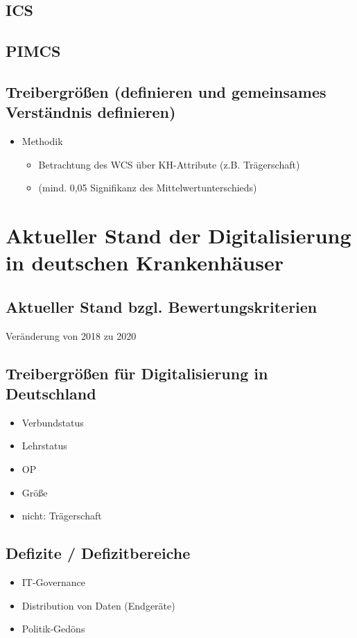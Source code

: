 	\subsection{ICS}
	\subsection{PIMCS}
	\subsection{Treibergrößen (definieren und gemeinsames Verständnis definieren)}
	\begin{itemize}
		\item Methodik
		\begin{itemize}
			\item Betrachtung des WCS über KH-Attribute (z.B. Trägerschaft)
			\item (mind. 0,05 Signifikanz des Mittelwertunterschieds)
		\end{itemize}
	\end{itemize}
\section{Aktueller Stand der Digitalisierung in deutschen Krankenhäuser}
	\subsection{Aktueller Stand bzgl. Bewertungskriterien}
		Veränderung von 2018 zu 2020
	\subsection{Treibergrößen für Digitalisierung in Deutschland}
	\begin{itemize}
		\item Verbundstatus \parencite{cresswell2013}
		\item Lehrstatus
		\item OP
		\item Größe \parencite{cresswell2013}
		\item nicht: Trägerschaft \parencite{cresswell2013}
	\end{itemize}
	\subsection{Defizite / Defizitbereiche}
	\begin{itemize}
		\item IT-Governance
		\item Distribution von Daten (Endgeräte)
		\item Politik-Gedöns
	\end{itemize}
